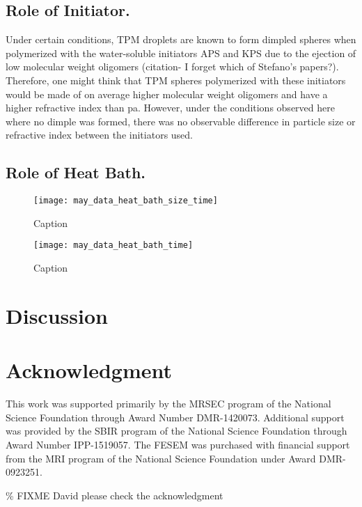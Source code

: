 \subsection{Role of Initiator.}

Under certain conditions, TPM droplets are known to form dimpled spheres when polymerized with
the water-soluble initiators APS and KPS due to the ejection of low molecular weight oligomers
(citation- I forget which of Stefano's papers?). Therefore, one might think that TPM spheres
polymerized with these initiators would be made of on average higher molecular weight oligomers
and have a higher refractive index than pa. However, under the conditions observed here where no
dimple was formed, there was no observable difference in particle size or refractive index between
the initiators used.

\subsection{Role of Heat Bath.}


\begin{figure}
    \centering
    \texttt{[image: may\_data\_heat\_bath\_size\_time]}
    \caption{Caption}
    \label{fig:heat_size_time}
\end{figure}



\begin{figure}
    \centering
    \texttt{[image: may\_data\_heat\_bath\_time]}
    \caption{Caption}
    \label{fig:heat_ref_time}
\end{figure}

\section{Discussion}

\section{Acknowledgment}

This work was supported primarily by the MRSEC program of
the National Science Foundation through Award Number DMR-1420073.
Additional support was provided by the SBIR program of the
National Science Foundation through Award Number IPP-1519057.
The FESEM was purchased with financial support from the MRI program
of the National Science Foundation under Award DMR-0923251.

\% FIXME David please check the acknowledgment
